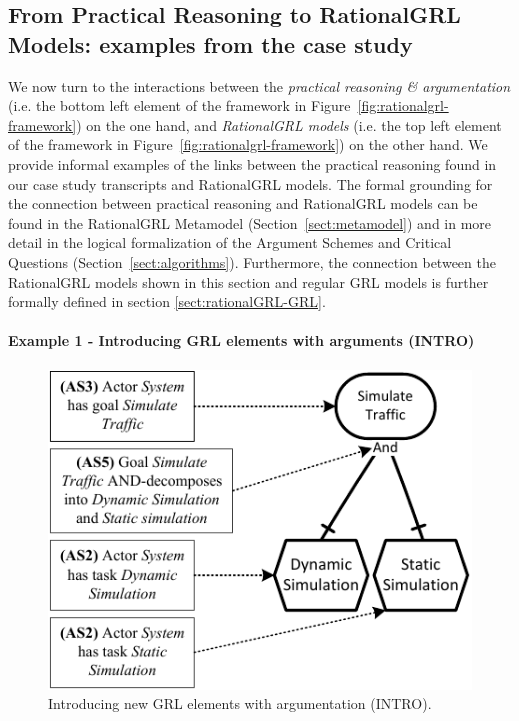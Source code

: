 \subsection{From Practical Reasoning to RationalGRL Models: examples from the case study}
\label{sect:overview:examples}

We now turn to the interactions between the \emph{practical reasoning \& argumentation} (i.e. the bottom left element of the framework in Figure~\ref{fig:rationalgrl-framework}) on the one hand, and \emph{RationalGRL models} (i.e. the top left element of the framework in Figure~\ref{fig:rationalgrl-framework}) on the other hand. We provide informal examples of the links between the practical reasoning found in our case study transcripts and RationalGRL models. The formal grounding for the connection between practical reasoning and RationalGRL models can be found in the RationalGRL Metamodel (Section~\ref{sect:metamodel}) and in more detail in the logical formalization of the Argument Schemes and Critical Questions (Section~\ref{sect:algorithms}). Furthermore, the connection between the RationalGRL models shown in this section and regular GRL models is further formally defined in section \ref{sect:rationalGRL-GRL}. 

\paragraph{Example 1 - Introducing GRL elements with arguments (\textsf{INTRO)}}

\begin{figure}[t]
\centering
\includegraphics[width=\columnwidth]{img/fig_example_AS.pdf}
\caption{Introducing new GRL elements with argumentation (\textsf{INTRO)}.}
\label{fig:example_AS}
\end{figure}

